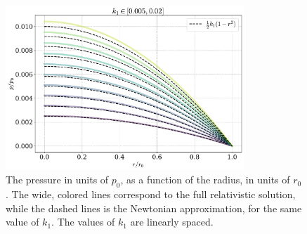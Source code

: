 \begin{figure}[h]
    \centering
    \includegraphics[width=0.8\textwidth]{../scripts/figurer/incompressible_newt.pdf}
    \caption{The pressure in units of $p_0$, as a function of the radius, in units of $r_0$. The wide, colored lines correspond to the full relativistic solution, while the dashed lines is the Newtonian approximation, for the same value of $k_1$. The values of $k_1$ are linearly spaced.  }
    \label{fig: pressure incompressible fluid newtonian}
\end{figure}


